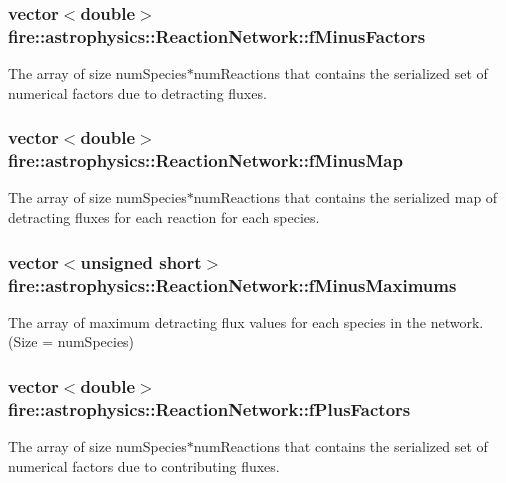 \subsubsection[{\texorpdfstring{f\+Minus\+Factors}{fMinusFactors}}]{\setlength{\rightskip}{0pt plus 5cm}vector$<$double$>$ fire\+::astrophysics\+::\+Reaction\+Network\+::f\+Minus\+Factors}\hypertarget{a00023_a3aff20108c80e14f9f4d526a08af49de}{}\label{a00023_a3aff20108c80e14f9f4d526a08af49de}
The array of size num\+Species$\ast$num\+Reactions that contains the serialized set of numerical factors due to detracting fluxes. 
\subsubsection[{\texorpdfstring{f\+Minus\+Map}{fMinusMap}}]{\setlength{\rightskip}{0pt plus 5cm}vector$<$double$>$ fire\+::astrophysics\+::\+Reaction\+Network\+::f\+Minus\+Map}\hypertarget{a00023_a9065be108e95b1604b0d53e2080f0b57}{}\label{a00023_a9065be108e95b1604b0d53e2080f0b57}
The array of size num\+Species$\ast$num\+Reactions that contains the serialized map of detracting fluxes for each reaction for each species. 
\subsubsection[{\texorpdfstring{f\+Minus\+Maximums}{fMinusMaximums}}]{\setlength{\rightskip}{0pt plus 5cm}vector$<$unsigned short$>$ fire\+::astrophysics\+::\+Reaction\+Network\+::f\+Minus\+Maximums}\hypertarget{a00023_a4ea51dc9d41bf555592f93bb237e0440}{}\label{a00023_a4ea51dc9d41bf555592f93bb237e0440}
The array of maximum detracting flux values for each species in the network. (Size = num\+Species) 
\subsubsection[{\texorpdfstring{f\+Plus\+Factors}{fPlusFactors}}]{\setlength{\rightskip}{0pt plus 5cm}vector$<$double$>$ fire\+::astrophysics\+::\+Reaction\+Network\+::f\+Plus\+Factors}\hypertarget{a00023_aca9928041359ecf555a63e4f58e80164}{}\label{a00023_aca9928041359ecf555a63e4f58e80164}
The array of size num\+Species$\ast$num\+Reactions that contains the serialized set of numerical factors due to contributing fluxes. 
